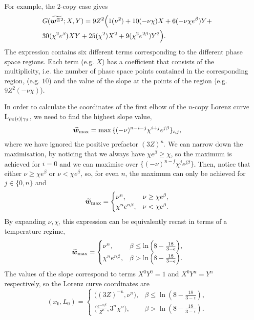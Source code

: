 \documentclass[pra,
aps,
twocolumn,
superscriptaddress,
groupedaddress,
nofootinbib,
reprint
]{revtex4-1}
\begin{document}
For example, the 2-copy case gives
\begin{equation}
	\begin{split}
	&G(\widetilde{\bm{w}^{\otimes 2}}; X,Y) = 9Z^2 \Big( 1(\nu^2) + 10(-\nu \chi)X + 6(-\nu \chi e^\beta) Y + \\
	&30 (\chi^2 e^\beta) XY + 25(\chi^2)X^2 + 9(\chi^2 e^{2\beta})Y^2 \Big).
	\end{split}
\end{equation}
The expression contains six different terms corresponding to the different phase space regions.
Each term (e.g. $X$) has a coefficient that consists of the multiplicity, i.e. the number of phase space points contained in the corresponding region, (e.g. $10$) and the value of the slope at the points of the region (e.g. $9Z^2(-\nu \chi)$).

In order to calculate the coordinates of the first elbow of the $n$-copy Lorenz curve ${{\rm{L}}_{\rho_{\rm{S}}(\epsilon)|\gamma_\beta}}$, we need to find the highest slope value,
\begin{equation}
	\widetilde{\bm{w}}_{\rm{max}} = \max{\{ (-\nu)^{n-i-j} \chi^{i+j} e^{j\beta} \}_{i,j}},
\end{equation}
where we have ignored the positive prefactor $(3Z)^n$.
We can narrow down the maximisation, by noticing that we always have $\chi e^\beta \geq \chi$, so the maximum is achieved for $i=0$ and we can maximise over $\{ (-\nu)^{n-j} \chi^{j} e^{j\beta} \}$.
Then, notice that either $\nu \geq \chi e^{\beta}$ or $\nu < \chi e^{\beta}$, so, for even $n$, the maximum can only be achieved for $j\in\{0,n\}$ and
\begin{equation}
	\widetilde{\bm{w}}_{\rm{max}} = 
	\begin{cases}
		\nu^n, &\nu \geq \chi e^{\beta}, \\
		\chi^n e^{n\beta}, &\nu < \chi e^{\beta}.
	\end{cases}
\end{equation}
By expanding $\nu, \chi$, this expression can be equivalently recast in terms of a temperature regime,
\begin{equation}\label{eq:temp_regime}
	\widetilde{\bm{w}}_{\rm{max}} = 
	\begin{cases}
		\nu^n, &\beta \leq \ln{\left(8-\frac{18}{3-\epsilon}\right)}, \\
		\chi^n e^{n\beta}, &\beta > \ln{\left(8-\frac{18}{3-\epsilon}\right)}.
	\end{cases}
\end{equation}
The values of the slope correspond to terms $X^0Y^0 = 1$ and $X^0Y^n = Y^n$ respectively, so the Lorenz curve coordinates are
\begin{equation}
	(x_0, L_0) = 
	\begin{cases}
		\Big( (3Z)^{-n}, \nu^n \Big), &\beta \leq \ln{\left(8-\frac{18}{3-\epsilon}\right)}, \\
		\Big( \frac{e^{-n\beta}}{Z^n}, 3^n\chi^n \Big), &\beta > \ln{\left(8-\frac{18}{3-\epsilon}\right)}.
	\end{cases}
\end{equation}
\end{document}
